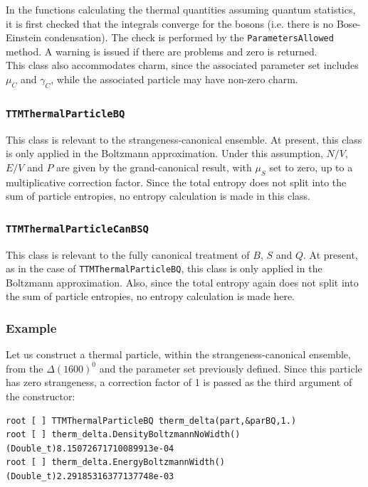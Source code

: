 \documentclass{elsarticle}
\begin{document}
In the functions calculating the thermal quantities assuming quantum statistics, it is 
first checked that the integrals converge for the bosons (i.e. there is no Bose-Einstein 
condensation). The check is performed by the \texttt{ParametersAllowed} method. A warning 
is issued if there are problems and zero is returned.\\ 

This class also accommodates charm, since the associated parameter set includes 
$\mu_C$ and $\gamma_C$, while the associated particle may have non-zero charm.\\


\subsubsection{\texttt{TTMThermalParticleBQ}}

This class is relevant to the strangeness-canonical ensemble. At present, this 
class is only applied in the Boltzmann approximation. Under this assumption, 
$N/V$, 
$E/V$ and $P$ are given by the grand-canonical result, with $\mu_S$ set to zero, up to a 
multiplicative correction factor. Since the total 
entropy does not split into the sum of particle entropies, no entropy calculation is made in this 
class.\\
 
\subsubsection{\texttt{TTMThermalParticleCanBSQ}}

This class is relevant to the fully canonical treatment of $B$, $S$ and $Q$. At
 present, as in the case of \texttt{TTMThermalParticleBQ}, this class is only applied in the
 Boltzmann approximation. Also, since the total 
entropy again does not split into the sum of particle entropies, no entropy calculation is made here.\\

\subsubsection{Example}

Let us construct a thermal particle, within the strangeness-canonical ensemble, from the 
$\Delta(1600)^0$ and the parameter set previously defined. Since this particle has zero strangeness, 
a correction factor of 1 is passed as the third argument of the constructor:

\small
\begin{verbatim}
root [ ] TTMThermalParticleBQ therm_delta(part,&parBQ,1.)
root [ ] therm_delta.DensityBoltzmannNoWidth()
(Double_t)8.15072671710089913e-04
root [ ] therm_delta.EnergyBoltzmannWidth()
(Double_t)2.29185316377137748e-03
\end{verbatim}
\normalsize
\end{document}
